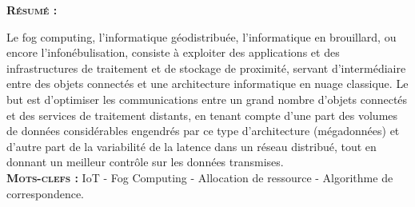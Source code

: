 \large{\textsc{\textbf{Résumé :}}}

Le fog computing, l'informatique géodistribuée, l'informatique en brouillard, ou encore l'infonébulisation, consiste à exploiter des applications et des infrastructures de traitement et de stockage de proximité, servant d'intermédiaire entre des objets connectés et une architecture informatique en nuage classique. Le but est d'optimiser les communications entre un grand nombre d'objets connectés et des services de traitement distants, en tenant compte d'une part des volumes de données considérables engendrés par ce type d'architecture (mégadonnées) et d'autre part de la variabilité de la latence dans un réseau distribué, tout en donnant un meilleur contrôle sur les données transmises.\\

\textsc{\textbf{Mots-clefs :}} IoT - Fog Computing - Allocation de ressource - Algorithme de correspondence.\\ \\